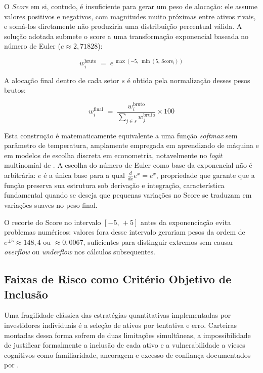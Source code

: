 O \textit{Score} em si, contudo, é insuficiente para gerar um peso de alocação: ele assume valores positivos e negativos, com magnitudes muito próximas entre ativos rivais, e somá-los diretamente não produziria uma distribuição percentual válida. A solução adotada submete o score a uma transformação exponencial baseada no número de Euler ($e \approx 2{,}71828$):

\begin{equation}
\label{eq:peso-bruto}
w_i^{\text{bruto}} \;=\; e^{\,\max(-5,\ \min(5,\ \text{Score}_i))}
\end{equation}

A alocação final dentro de cada setor $s$ é obtida pela normalização desses pesos brutos:

\begin{equation}
\label{eq:peso-final}
w_i^{\text{final}} \;=\; \frac{w_i^{\text{bruto}}}{\displaystyle\sum_{j \in s} w_j^{\text{bruto}}} \times 100
\end{equation}

Esta construção é matematicamente equivalente a uma função \textit{softmax} sem parâmetro de temperatura, amplamente empregada em aprendizado de máquina e em modelos de escolha discreta em econometria, notavelmente no \textit{logit} multinomial de . A escolha do número de Euler como base da exponencial não é arbitrária: $e$ é a única base para a qual $\frac{d}{dx}e^x = e^x$, propriedade que garante que a função preserva sua estrutura sob derivação e integração, característica fundamental quando se deseja que pequenas variações no Score se traduzam em variações suaves no peso final.

O recorte do Score no intervalo $[-5,\, +5]$ antes da exponenciação evita problemas numéricos: valores fora desse intervalo gerariam pesos da ordem de $e^{\pm 5} \approx 148{,}4$ ou $\approx 0{,}0067$, suficientes para distinguir extremos sem causar \textit{overflow} ou \textit{underflow} nos cálculos subsequentes.

\subsection{Faixas de Risco como Critério Objetivo de Inclusão}
\label{subsec:faixas-inclusao}

Uma fragilidade clássica das estratégias quantitativas implementadas por investidores individuais é a seleção de ativos por tentativa e erro. Carteiras montadas dessa forma sofrem de duas limitações simultâneas, a impossibilidade de justificar formalmente a inclusão de cada ativo e a vulnerabilidade a vieses cognitivos como familiaridade, ancoragem e excesso de confiança documentados por .

